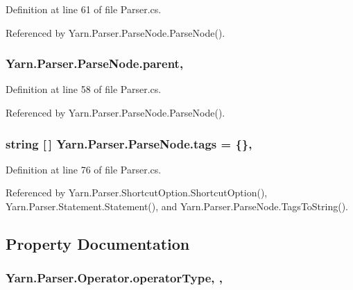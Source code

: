 Definition at line 61 of file Parser.\-cs.



Referenced by Yarn.\-Parser.\-Parse\-Node.\-Parse\-Node().

\hypertarget{a00138_af313a82103fcc2ff5a177dbb06b92f7b}{
\subsubsection[{parent}]{ Yarn.\-Parser.\-Parse\-Node.\-parent\hspace{0.3cm}{\ttfamily [package]}, {\ttfamily [inherited]}}}\label{a00138_af313a82103fcc2ff5a177dbb06b92f7b}


Definition at line 58 of file Parser.\-cs.



Referenced by Yarn.\-Parser.\-Parse\-Node.\-Parse\-Node().

\hypertarget{a00138_a58b3a15788fd2d4127d73619dc6d04ae}{
\subsubsection[{tags}]{\setlength{\rightskip}{0pt plus 5cm}string \mbox{[}$\,$\mbox{]} Yarn.\-Parser.\-Parse\-Node.\-tags = \{\}\hspace{0.3cm}{\ttfamily [package]}, {\ttfamily [inherited]}}}\label{a00138_a58b3a15788fd2d4127d73619dc6d04ae}


Definition at line 76 of file Parser.\-cs.



Referenced by Yarn.\-Parser.\-Shortcut\-Option.\-Shortcut\-Option(), Yarn.\-Parser.\-Statement.\-Statement(), and Yarn.\-Parser.\-Parse\-Node.\-Tags\-To\-String().



\subsection{Property Documentation}
\hypertarget{a00133_ac2de2f59be0e69b316627a4de16fadd3}{
\subsubsection[{operator\-Type}]{ Yarn.\-Parser.\-Operator.\-operator\-Type\hspace{0.3cm}{\ttfamily [get]}, {\ttfamily [set]}, {\ttfamily [package]}}}\label{a00133_ac2de2f59be0e69b316627a4de16fadd3}


